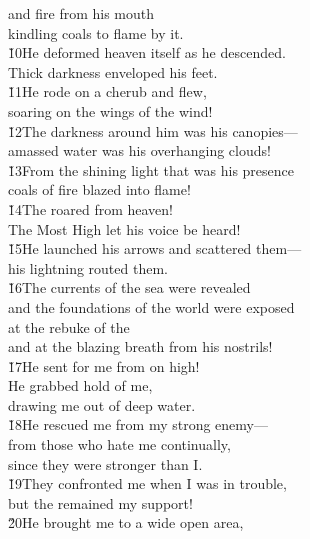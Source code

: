 \begin{poetry}
\poemll    and fire from his mouth \\
\poemlll       kindling coals to flame by it. \\
\poeml \v{10}He deformed heaven itself as he descended. \\
\poemll    Thick darkness enveloped his feet. \\
\poeml \v{11}He rode on a cherub and flew, \\
\poemll    soaring on the wings of the wind! \\
\poeml \v{12}The darkness around him was his canopies--- \\
\poemll    amassed water was his overhanging clouds! \\
\poeml \v{13}From the shining light that was his presence \\
\poemll    coals of fire blazed into flame! \\
\poeml \v{14}The  roared from heaven! \\
\poemll    The Most High let his voice be heard! \\
\poeml \v{15}He launched his arrows and scattered them--- \\
\poemll    his lightning routed them. \\
\poeml \v{16}The currents of the sea were revealed \\
\poemll    and the foundations of the world were exposed \\
\poeml at the rebuke of the  \\
\poemll    and at the blazing breath from his nostrils! \\
\poeml \v{17}He sent for me from on high! \\
\poemll    He grabbed hold of me, \\
\poemlll       drawing me out of deep water. \\
\poeml \v{18}He rescued me from my strong enemy--- \\
\poemll    from those who hate me continually, \\
\poemlll       since they were stronger than I. \\
\poeml \v{19}They confronted me when I was in trouble, \\
\poemll    but the  remained my support! \\
\poeml \v{20}He brought me to a wide open area, \\

\end{poetry}
